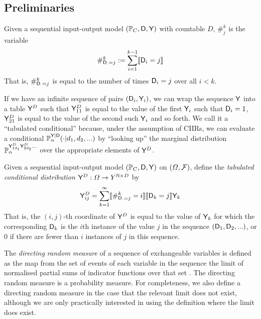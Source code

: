 \subsection{Preliminaries}\label{sec:rep_theorem_background}

\begin{definition}\label{def:count_of_inputs}
Given a sequential input-output model $(\mathbb{P}_C,\mathsf{D},\mathsf{Y})$ with countable $D$, $\#_{j}^k$ is the variable
\begin{align}
    \#_{\mathsf{D}_{\cdot}=j}^k := \sum_{i=1}^{k-1} \llbracket \mathsf{D}_i = j \rrbracket
\end{align}
That is, $\#_{\mathsf{D}_{\cdot}=j}^k$ is equal to the number of times $\mathsf{D}_i=j$ over all $i<k$.
\end{definition}

If we have an infinite sequence of pairs $(\mathsf{D}_i,\mathsf{Y}_i)$, we can wrap the sequence $\mathsf{Y}$ into a table $\mathsf{Y}^D$ such that $\mathsf{Y}^D_{11}$ is equal to the value of the first $\mathsf{Y}_i$ such that $\mathsf{D}_i=1$, $\mathsf{Y}^D_{21}$ is equal to the value of the second such $\mathsf{Y}_i$ and so forth. We call it a ``tabulated conditional'' because, under the assumption of CIIRs, we can evaluate a conditional $\mathbb{P}_\alpha^{\mathsf{Y}|\mathsf{D}}(\cdot|d_1,d_2,...)$ by ``looking up'' the marginal distribution $\mathbb{P}_\alpha^{\mathsf{Y}^D_{1 d_1}\mathsf{Y}^D_{2 d_2}...}$ over the appropriate elements of $\mathsf{Y}^D$.

\begin{definition}\label{def:tab_cd}
Given a sequential input-output model $(\mathbb{P}_C,\mathsf{D},\mathsf{Y})$ on $(\Omega,\mathcal{F})$, define the \emph{tabulated conditional distribution} $\mathsf{Y}^D:\Omega\to Y^{\mathbb{N}\times D}$ by
\begin{align}
    \mathsf{Y}^D_{ij} = \sum_{k=1}^{\infty} \llbracket \#_{\mathsf{D}_{\cdot}=j}^k = i\rrbracket \llbracket \mathsf{D}_k = j \rrbracket \mathsf{Y}_k
\end{align}
That is, the $(i,j)$-th coordinate of $\mathsf{Y}^D$ is equal to the value of $\mathsf{Y}_k$ for which the corresponding $\mathsf{D}_k$ is the $i$th instance of the value $j$ in the sequence $(\mathsf{D}_1,\mathsf{D}_2,...)$, or 0 if there are fewer than $i$ instances of $j$ in this sequence.
\end{definition}

The \emph{directing random measure} of a sequence of exchangeable variables is defined as the map from the set of events of each variable in the sequence the limit of normalised partial sums of indicator functions over that set \citep{kallenberg_basic_2005}. The directing random measure is a probability measure. For completeness, we also define a directing random measure in the case that the relevant limit does not exist, although we are only practically interested in using the definition where the limit does exist.

